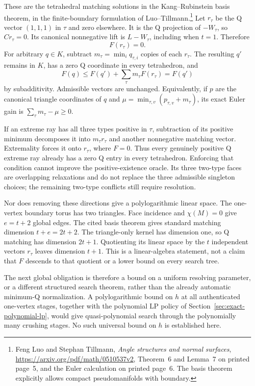 These are the tetrahedral matching solutions in the Kang--Rubinstein
basis theorem, in the finite-boundary formulation of Luo--Tillmann.\footnote{%
Feng Luo and Stephan Tillmann, \emph{Angle structures and normal surfaces},
\url{https://arxiv.org/pdf/math/0510537v2}, Theorem~6 and Lemma~7
on printed page~5, and the Euler calculation on printed page~6.
The basis theorem explicitly allows compact pseudomanifolds with boundary.}
Let $r_\tau$ be the Q vector $(1,1,1)$ in $\tau$ and zero elsewhere.
It is the Q projection of $-W_\tau$, so $Cr_\tau=0$.  Its canonical
nonnegative lift is $L-W_\tau$, including when $t=1$.  Therefore
\[
 F(r_\tau)=0.
\]
For arbitrary $q\in K$, subtract
$m_\tau=\min_iq_{\tau,i}$ copies of each $r_\tau$.  The resulting $q'$
remains in $K$, has a zero Q coordinate in every tetrahedron, and
\[
 F(q)\le F(q')+\sum_\tau m_\tau F(r_\tau)=F(q')
\]
by subadditivity.  Admissible vectors are unchanged.  Equivalently, if
$p$ are the canonical triangle coordinates of $q$ and
$\mu=\min_{\tau,v}(p_{\tau,v}+m_\tau)$, its exact Euler gain is
$\sum_\tau m_\tau-\mu\ge0$.

If an extreme ray has all three types positive in $\tau$, subtraction
of its positive minimum decomposes it into $m_\tau r_\tau$ and another
nonnegative matching vector.  Extremality forces it onto $r_\tau$, where
$F=0$.  Thus every genuinely positive Q extreme ray already has a zero
Q entry in every tetrahedron.  Enforcing that condition cannot improve
the positive-existence oracle.  Its three two-type faces are overlapping
relaxations and do not replace the three admissible singleton choices;
the remaining two-type conflicts still require resolution.

Nor does removing these directions give a polylogarithmic linear space.
The one-vertex boundary torus has two triangles.  Face incidence and
$\chi(M)=0$ give $e=t+2$ global edges.  The cited basis theorem gives
standard matching dimension $t+e=2t+2$.  The triangle-only kernel has
dimension one, so Q matching has dimension $2t+1$.  Quotienting its
linear space by the $t$ independent vectors $r_\tau$ leaves dimension
$t+1$.  This is a linear-algebra statement, not a claim that $F$ descends
to that quotient or a lower bound on every search tree.

The next global obligation is therefore a bound on a uniform resolving
parameter, or a different structured search theorem, rather than the
already automatic minimum-Q normalization.  A polylogarithmic bound on
$h$ at all authenticated one-vertex stages, together with the polynomial
LP policy of Section~\ref{sec:exact-polynomial-lp}, would give
quasi-polynomial search through the polynomially many crushing stages.
No such universal bound on $h$ is established here.

